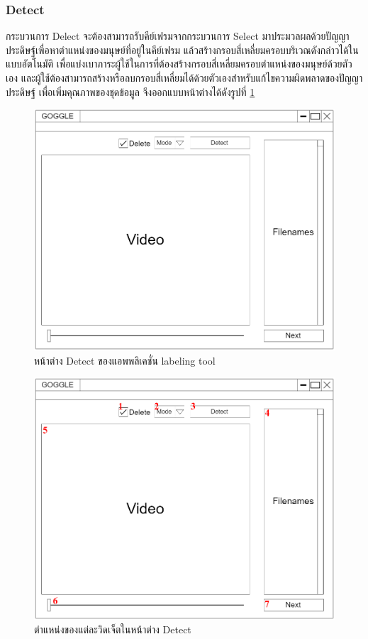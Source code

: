 \subsubsection{Detect}
กระบวนการ Delect จะต้องสามารถรับคีย์เฟรมจากกระบวนการ Select มาประมวลผลด้วยปัญญาประดิษฐ์เพื่อหาตำแหน่งของมนุษย์ที่อยู่ในคีย์เฟรม 
แล้วสร้างกรอบสี่เหลี่ยมครอบบริเวณดังกล่าวได้ในแบบอัตโนมัติ เพื่อแบ่งเบาภาระผู้ใช้ในการที่ต้องสร้างกรอบสี่เหลี่ยมครอบตำแหน่งของมนุษย์ด้วยตัวเอง
และผู้ใช้ต้องสามารถสร้างหรือลบกรอบสี่เหลี่ยมได้ด้วยตัวเองสำหรับแก้ไขความผิดพลาดของปัญญาประดิษฐ์ เพื่อเพิ่มคุณภาพของชุดข้อมูล
จึงออกแบบหน้าต่างได้ดังรูปที่ \ref{fig:DetectDraft}
\begin{figure}[!ht]
    \centering
    \includegraphics[width=1\textwidth]{chapter3/images/3_6/DetectDraft.png}
    \caption{หน้าต่าง Detect ของแอพพลิเคชั่น labeling tool}
    \label{fig:DetectDraft}
\end{figure}
\clearpage
\begin{figure}[!ht]
    \centering
    \includegraphics[width=1\textwidth]{chapter3/images/3_6/DetectDraft_point.png}
    \caption{ตำแหน่งของแต่ละวิดเจ็ตในหน้าต่าง Detect}
    \label{fig:DelectDraft_point}
\end{figure}
